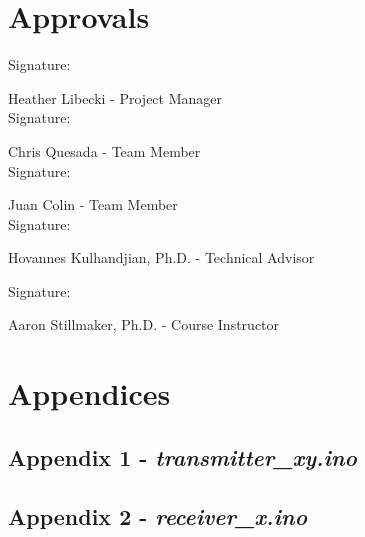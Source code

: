 \section{Approvals}
\setlength{\parindent}{15ex}
\vspace{0.5in}
	\begin{flushleft}
	Signature: \hrulefill
	
	\hspace*{0mm}\phantom{Approved: }Heather Libecki - Project Manager\\
	\vspace{12pt}
	Signature: \hrulefill
	
	\hspace*{0mm}\phantom{Approved: }Chris Quesada - Team Member\\
	\vspace{12pt}
	Signature: \hrulefill
	
	\hspace*{0mm}\phantom{Approved: }Juan Colin - Team Member\\
	\vspace{12pt}
	Signature: \hrulefill
	
	\hspace*{0mm}\phantom{Approved: }Hovannes Kulhandjian, Ph.D. -
	 Technical Advisor\\
	 \vspace{12pt}
	 
	 Signature: \hrulefill
	 
	 \hspace*{0mm}\phantom{Approved: }Aaron Stillmaker, Ph.D. -
	 Course Instructor\\
	 \vspace{12pt}


\end{flushleft}\par
\newpage


	
		
\newpage
\section{Appendices}

\subsection{Appendix 1 - \textit{transmitter\_xy.ino}}


\subsection{Appendix 2 - \textit{receiver\_x.ino}}


